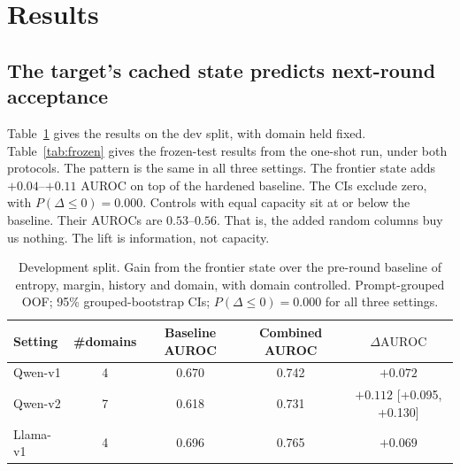 \documentclass[11pt]{article}
\newcommand{\toprule}{\hline\hline}%
\newcommand{\midrule}{\hline}%
\newcommand{\bottomrule}{\hline\hline}}
\newcommand{\deltaAUROC}{\ensuremath{\Delta\mathrm{AUROC}}}
\newcommand{\pdle}{\ensuremath{P(\Delta\le 0)}}
\begin{document}
\section{Results}
\subsection{The target's cached state predicts next-round acceptance}
\label{sec:results-main}

Table~\ref{tab:dev} gives the results on the dev split, with domain held
fixed. Table~\ref{tab:frozen} gives the frozen-test results from the one-shot
run, under both protocols. The pattern is the same in all three settings. The
frontier state adds $+0.04$--$+0.11$ AUROC on top of the hardened baseline.
The CIs exclude zero, with $\pdle=0.000$. Controls with equal capacity sit at
or below the baseline. Their AUROCs are $0.53$--$0.56$. That is, the added
random columns buy us nothing. The lift is information, not capacity.



\begin{table}[t]
\centering
\caption{Development split. Gain from the frontier state over the
pre-round baseline of entropy, margin, history and domain, with domain
controlled. Prompt-grouped OOF; 95\% grouped-bootstrap CIs; $\pdle=0.000$ for
all three settings.}
\label{tab:dev}
\begin{tabular}{lcccc}
\toprule
Setting & \#domains & Baseline AUROC & Combined AUROC & \deltaAUROC \\
\midrule
Qwen-v1 & 4 & 0.670 & 0.742 & $+0.072$ \\
Qwen-v2 & 7 & 0.618 & 0.731 & $+0.112$ \; {\footnotesize[+0.095, +0.130]} \\
Llama-v1 & 4 & 0.696 & 0.765 & $+0.069$ \\
\bottomrule
\end{tabular}
\end{table}
\end{document}
